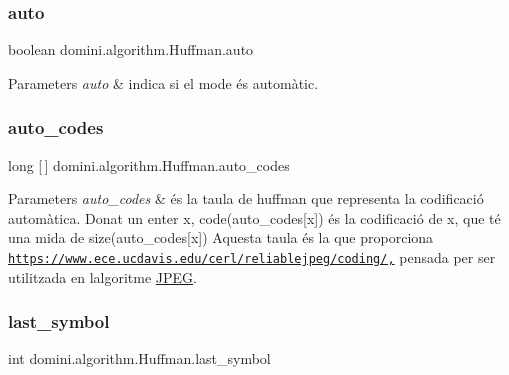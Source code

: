 \subsubsection{\texorpdfstring{auto}{auto}}
{\footnotesize\ttfamily boolean domini.\+algorithm.\+Huffman.\+auto\hspace{0.3cm}{\ttfamily [private]}}


\begin{DoxyParams}{Parameters}
{\em auto} & indica si el mode és automàtic. \\
\hline
\end{DoxyParams}
\mbox{\label{classdomini_1_1algorithm_1_1Huffman_a0fa542dd4e914d8c0da5c070fe9f682f}} 
\subsubsection{\texorpdfstring{auto\+\_\+codes}{auto\_codes}}
{\footnotesize\ttfamily long \mbox{[}$\,$\mbox{]} domini.\+algorithm.\+Huffman.\+auto\+\_\+codes\hspace{0.3cm}{\ttfamily [private]}}


\begin{DoxyParams}{Parameters}
{\em auto\+\_\+codes} & és la taula de huffman que representa la codificació automàtica. Donat un enter x, code(auto\+\_\+codes\mbox{[}x\mbox{]}) és la codificació de x, que té una mida de size(auto\+\_\+codes\mbox{[}x\mbox{]}) Aquesta taula és la que proporciona \href{https://www.ece.ucdavis.edu/cerl/reliablejpeg/coding/,}{\tt https\+://www.\+ece.\+ucdavis.\+edu/cerl/reliablejpeg/coding/,} pensada per ser utilitzada en l\textquotesingle{}algoritme \hyperlink{classdomini_1_1algorithm_1_1JPEG}{J\+P\+EG}. \\
\hline
\end{DoxyParams}
\mbox{\label{classdomini_1_1algorithm_1_1Huffman_a0da0a4274a58653bbe3e1c753adfbe38}} 
\subsubsection{\texorpdfstring{last\+\_\+symbol}{last\_symbol}}
{\footnotesize\ttfamily int domini.\+algorithm.\+Huffman.\+last\+\_\+symbol\hspace{0.3cm}{\ttfamily [private]}}


